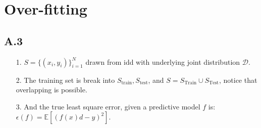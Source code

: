 \documentclass[]{article}
\begin{document}
\section*{Over-fitting}
    \subsection*{A.3}
        \begin{enumerate}
        \item[1.] $S = \{(x_i, y_i)\}_{i = 1}^N$ drawn from idd with underlying joint distribution $\mathcal{D}$. 
        \item[2.] The training set is break into $S_\text{train}, S_\text{test}$, and $S = S_\text{Train} \cup S_\text{Test}$, notice that overlapping is possible. 
        \item[3.] And the true least square error, given a predictive model $f$ is: $\epsilon(f) = \mathbb{E}\left[(f(x) d - y)^2\right]$. 
        \end{enumerate}
\end{document}
